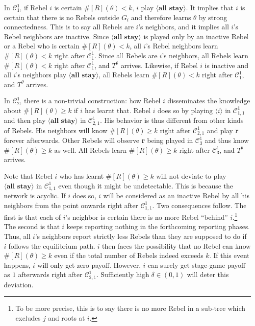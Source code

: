 \documentclass[12pt,letter]{article}
\newcommand{\Kappa}{\mathcal{C}}
\theoremstyle{definition}
\theoremstyle{remark}
\theoremstyle{claim}
\begin{document}
In $\Kappa^1_1$, if Rebel $i$ is certain $\#[R](\theta)<k$, $i$ play $\langle \textbf{all stay} \rangle$. It implies that $i$ is certain that there is no Rebels outside $G_i$ and therefore learns $\theta$ by strong connectedness. This is to say all Rebels are $i$'s neighbors, and it implies all $i$'s Rebel neighbors are inactive. Since $\langle \textbf{all stay} \rangle$ is played only by an inactive Rebel or a Rebel who is certain $\#[R](\theta)<k$, all $i$'s Rebel neighbors learn $\#[R](\theta)<k$ right after $\Kappa^1_1$. Since all Rebels are $i$'s neighbors, all Rebels learn $\#[R](\theta)<k$ right after $\Kappa^1_1$, and $T^{\theta}$ arrives. Likewise, if Rebel $i$ is inactive and all $i$'s neighbors play $\langle \textbf{all stay} \rangle$, all Rebels learn $\#[R](\theta)<k$ right after $\Kappa^1_1$, and $T^{\theta}$ arrives.    

In $\Kappa^1_2$, there is a non-trivial construction: how Rebel $i$ disseminates the knowledge about $\#[R](\theta)\geq k$ if $i$ has learnt that. Rebel $i$ does so by playing $\langle i \rangle$ in $\Kappa^1_{1,1}$ and then play $\langle \textbf{all stay} \rangle$ in $\Kappa^1_{2,1}$. His behavior is thus different from other kinds of Rebels. His neighbors will know $\#[R](\theta)\geq k$ right after $\Kappa^1_{2,1}$ and play \textbf{r} forever afterwards. Other Rebels will observe \textbf{r} being played in $\Kappa^1_{3}$ and thus know $\#[R](\theta)\geq k$ as well. All Rebels learn $\#[R](\theta)\geq k$ right after $\Kappa^1_3$, and $T^{\theta}$ arrives.

Note that Rebel $i$ who has learnt $\#[R](\theta)\geq k$ will not deviate to play $\langle \textbf{all stay} \rangle$ in $\Kappa^1_{1,1}$ even though it might be undetectable. This is because the network is acyclic. If $i$ does so, $i$ will be considered as an inactive Rebel by all his neighbors from the point onwards right after $\Kappa^1_{1,1}$. Two consequences follow. The first is that each of $i$'s neighbor is certain there is no more Rebel ``behind'' $i$.\footnote{To be more precise, this is to say there is no more Rebel in a sub-tree which excludes $j$ and roots at $i$.} 
The second is that $i$ keeps reporting nothing in the forthcoming reporting phases. Thus, all $i$'s neighbors report strictly less Rebels than they are supposed to do if $i$ follows the equilibrium path. $i$ then faces the possibility that no Rebel can know $\#[R](\theta)\geq k$ even if the total number of Rebels indeed exceeds $k$. If this event happens, $i$ will only get zero payoff. However, $i$ can surely get stage-game payoff as $1$ afterwards right after $\Kappa^1_{2,1}$. Sufficiently high $\delta\in(0,1)$ will deter this deviation. 
\end{document}
